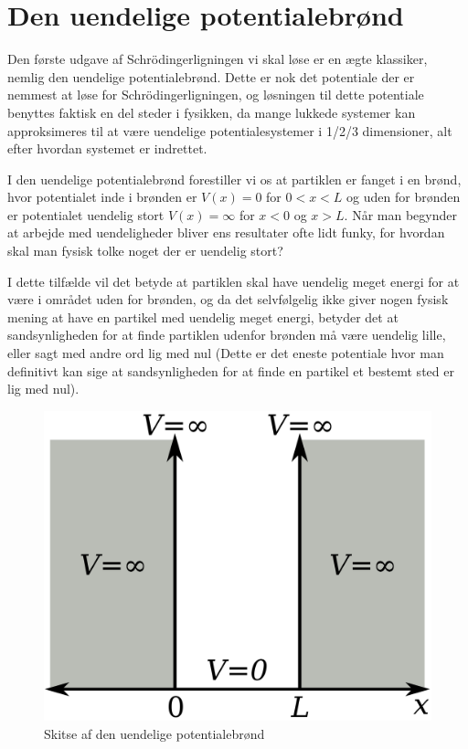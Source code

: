 \documentclass[../Kvantemekanik.tex]{subfiles}
\begin{document}
\section{Den uendelige potentialebrønd}
Den første udgave af Schrödingerligningen vi skal løse er en ægte klassiker, nemlig den uendelige potentialebrønd. Dette er nok det potentiale der er nemmest at løse for Schrödingerligningen, og løsningen til dette potentiale benyttes faktisk en del steder i fysikken, da mange lukkede systemer kan approksimeres til at være uendelige potentialesystemer i 1/2/3 dimensioner, alt efter hvordan systemet er indrettet.

I den uendelige potentialebrønd forestiller vi os at partiklen er fanget i en brønd, hvor potentialet inde i brønden er $V(x)=0$ for $0<x<L$ og uden for brønden er potentialet uendelig stort $V(x)=\infty$ for $x<0$ og $x>L$. Når man begynder at arbejde med uendeligheder bliver ens resultater ofte lidt funky, for hvordan skal man fysisk tolke noget der er uendelig stort?

I dette tilfælde vil det betyde at partiklen skal have uendelig meget energi for at være i området uden for brønden, og da det selvfølgelig ikke giver nogen fysisk mening at have en partikel med uendelig meget energi, betyder det at sandsynligheden for at finde partiklen udenfor brønden må være uendelig lille, eller sagt med andre ord lig med nul (Dette er det eneste potentiale hvor man definitivt kan sige at sandsynligheden for at finde en partikel et bestemt sted er lig med nul).
\begin{figure}[h]
    \centering
    \includegraphics[scale=0.13]{Kvantemekanik/billeder/uendelig.png}
    \caption{Skitse af den uendelige potentialebrønd}
    \label{fig:uendelig}
\end{figure}
\end{document}
